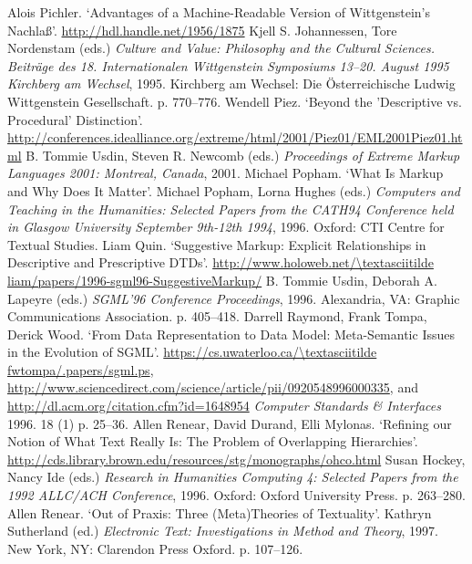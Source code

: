 \begin{bibitemlist}{1}
\label{Pichler1995}Alois Pichler. ‘Advantages of a Machine-Readable Version of Wittgenstein's Nachlaß’.  \url{http://hdl.handle.net/1956/1875} Kjell S. Johannessen, Tore Nordenstam (eds.) \textit{Culture and Value: Philosophy and the Cultural Sciences. Beiträge des 18. Internationalen Wittgenstein Symposiums 13–20. August 1995 Kirchberg am Wechsel}, 1995. Kirchberg am Wechsel: Die Österreichische Ludwig Wittgenstein Gesellschaft. p. 770–776. 
\label{Piez2001}Wendell Piez. ‘Beyond the 'Descriptive vs. Procedural' Distinction’.  \url{http://conferences.idealliance.org/extreme/html/2001/Piez01/EML2001Piez01.html} B. Tommie Usdin, Steven R. Newcomb (eds.) \textit{Proceedings of Extreme Markup Languages 2001: Montreal, Canada}, 2001. 
\label{Popham1996}Michael Popham. ‘What Is Markup and Why Does It Matter’. Michael Popham, Lorna Hughes (eds.) \textit{Computers and Teaching in the Humanities: Selected Papers from the CATH94 Conference held in Glasgow University September 9th-12th 1994}, 1996. Oxford: CTI Centre for Textual Studies. 
\label{Quin1996}Liam Quin. ‘Suggestive Markup: Explicit Relationships in Descriptive and Prescriptive DTDs’.  \url{http://www.holoweb.net/\textasciitilde liam/papers/1996-sgml96-SuggestiveMarkup/} B. Tommie Usdin, Deborah A. Lapeyre (eds.) \textit{SGML'96 Conference Proceedings}, 1996. Alexandria, VA: Graphic Communications Association. p. 405–418. 
\label{Raymondetal1996}Darrell Raymond, Frank Tompa, Derick Wood. ‘From Data Representation to Data Model: Meta-Semantic Issues in the Evolution of SGML’.  \url{https://cs.uwaterloo.ca/\textasciitilde fwtompa/.papers/sgml.ps}, \url{http://www.sciencedirect.com/science/article/pii/0920548996000335}, and \url{http://dl.acm.org/citation.cfm?id=1648954} \textit{Computer Standards \& Interfaces} 1996. 18  (1)  p. 25–36. 
\label{Renearetal1996}Allen Renear, David Durand, Elli Mylonas. ‘Refining our Notion of What Text Really Is: The Problem of Overlapping Hierarchies’.  \url{http://cds.library.brown.edu/resources/stg/monographs/ohco.html} Susan Hockey, Nancy Ide (eds.) \textit{Research in Humanities Computing 4: Selected Papers from the 1992 ALLC/ACH Conference}, 1996. Oxford: Oxford University Press. p. 263–280. 
\label{Renear1997}Allen Renear. ‘Out of Praxis: Three (Meta)Theories of Textuality’. Kathryn Sutherland (ed.) \textit{Electronic Text: Investigations in Method and Theory}, 1997. New York, NY: Clarendon Press Oxford. p. 107–126. 

\end{bibitemlist}
